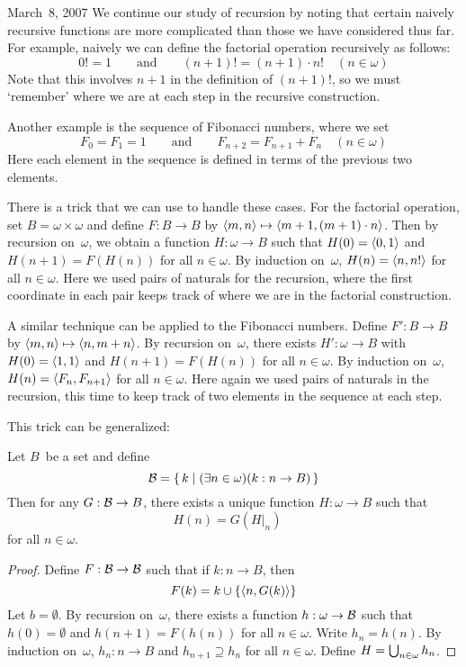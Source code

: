 \begin{lecture}{March~8, 2007}
We continue our study of recursion by noting that certain naively recursive functions are more complicated than those we have considered thus far. For example, naively we can define the factorial operation recursively as follows:
\[0!=1\qquad\text{and}\qquad (n+1)!=(n+1)\cdot n!\quad (n\in\omega)\]
Note that this involves \(n+1\) in the definition of \((n+1)!\), so we must `remember' where we are at each step in the recursive construction.

Another example is the sequence of Fibonacci numbers, where we set
\[F_0=F_1=1\qquad\text{and}\qquad F_{n+2}=F_{n+1}+F_n\quad (n\in\omega)\]
Here each element in the sequence is defined in terms of the previous two elements.

There is a trick that we can use to handle these cases. For the factorial operation, set \(B=\omega\times\omega\) and define \(F:B\to B\) by \(\langle{m},{n}\rangle\mapsto\langle{m+1},{(m+1)\cdot n}\rangle\). Then by recursion on~\(\omega\), we obtain a function \(H:\omega\to B\) such that \(H(0)=\langle{0},{1}\rangle\) and \(H(n+1)=F(H(n))\) for all \(n\in\omega\). By induction on~\(\omega\), \(H(n)=\langle{n},{n!}\rangle\) for all \(n\in\omega\). Here we used pairs of naturals for the recursion, where the first coordinate in each pair keeps track of where we are in the factorial construction.

A similar technique can be applied to the Fibonacci numbers. Define \(F':B\to B\) by \(\langle{m},{n}\rangle\mapsto\langle{n},{m+n}\rangle\). By recursion on~\(\omega\), there exists \(H':\omega\to B\) with \(H(0)=\langle{1},{1}\rangle\) and \(H(n+1)=F(H(n))\) for all \(n\in\omega\). By induction on~\(\omega\), \(H(n)=\langle{F_n},{F_{n+1}}\rangle\) for all \(n\in\omega\). Here again we used pairs of naturals in the recursion, this time to keep track of two elements in the sequence at each step.

This trick can be generalized:
\begin{thm}
Let \(B\)~be a set and define
\[\mathcal{B}=\{\,k\mid(\exists n\in\omega)(k:n\to B)\,\}\]
Then for any \(G:\mathcal{B}\to B\), there exists a unique function \(H:\omega\to B\) such that
\[H(n)=G(H|_n)\quad\]
for all \(n\in\omega\).
\end{thm}
\begin{proof}
Define \(F:\mathcal{B}\to\mathcal{B}\) such that if \(k:n\to B\), then
\[F(k)=k\cup\{\langle{n},{G(k)}\rangle\}\]
Let \(b=\emptyset\). By recursion on~\(\omega\), there exists a function \(h:\omega\to\mathcal{B}\) such that \(h(0)=\emptyset\) and \(h(n+1)=F(h(n))\) for all \(n\in\omega\). Write \(h_n=h(n)\). By induction on~\(\omega\), \(h_n:n\to B\) and \(h_{n+1}\supseteq h_n\) for all \(n\in\omega\). Define \(H=\bigcup_{n\in\omega} h_n\).


\end{proof}
\end{lecture}
